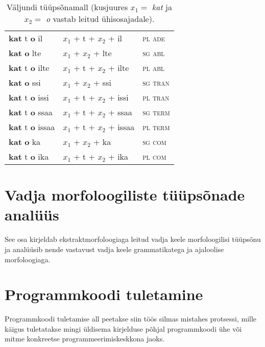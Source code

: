 \documentclass[12pt,a4paper]{article}
\begin{document}
\begin{table}[H]
\begin{minipage}[t]{.55\textwidth}
\begin{tabular}[t]{l l l}
      \textbf{kat} t \textbf{o} il    & $x_1$ + t + $x_2$ + il    & \textsc{pl ade} \\
      \textbf{kat}   \textbf{o} lte   & $x_1$ + $x_2$ + lte       & \textsc{sg abl} \\
      \textbf{kat} t \textbf{o} ilte  & $x_1$ + t + $x_2$ + ilte  & \textsc{pl abl} \\
      \textbf{kat}   \textbf{o} ssi   & $x_1$ + $x_2$ + ssi       & \textsc{sg tran} \\
      \textbf{kat} t \textbf{o} issi  & $x_1$ + t + $x_2$ + issi  & \textsc{pl tran} \\
      \textbf{kat} t \textbf{o} ssaa  & $x_1$ + t + $x_2$ + ssaa  & \textsc{sg term} \\
      \textbf{kat} t \textbf{o} issaa & $x_1$ + t + $x_2$ + issaa & \textsc{pl term} \\
      \textbf{kat}   \textbf{o} ka    & $x_1$ + $x_2$ + ka        & \textsc{sg com} \\
      \textbf{kat} t \textbf{o} ika   & $x_1$ + t + $x_2$ + ika   & \textsc{pl com} \\
    \end{tabular}
    \caption{Väljundi tüüpsõnamall (kus\-juures $x_1 = $ \textit{kat} ja $x_2 = $ \textit{o} vastab leitud ühisosajadale).}
    \label{tab:väljundtabel_katto}
  \end{minipage}
\end{table}








\newpage
\section{Vadja morfoloogiliste tüüpsõnade analüüs}
\label{sec:analüüs}

See osa kirjeldab ekstraktmorfoloogiaga leitud vadja keele morfoloogilisi tüüpsõnu ja analüüsib nende vastavust vadja keele grammatikatega ja ajaloolise morfoloogiaga.




\newpage
\section{Programmkoodi tuletamine}
\label{sec:programmkoodi-tuletamine}

Programmkoodi tuletamise all peetakse siin töös silmas mistahes protsessi, mille käigus tuletatakse mingi üldisema kirjelduse põhjal programmkoodi ühe või mitme konkreetse programmeerimiskeskkona jaoks.
\end{document}
